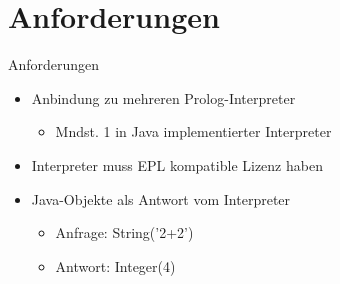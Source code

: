\documentclass[18pt]{beamer}
\begin{document}
\section{Anforderungen}
\begin{frame}{Anforderungen}
\begin{itemize}
\item Anbindung zu mehreren Prolog-Interpreter
\begin{itemize}
\item Mndst. 1 in Java implementierter Interpreter
\end{itemize}
\vspace{0.3cm}
\item Interpreter muss EPL kompatible Lizenz haben
\vspace{0.3cm}
\item Java-Objekte als Antwort vom Interpreter
\begin{itemize}
\item Anfrage: String('2+2')
\item Antwort: Integer(4)
\end{itemize}
\end{itemize}
\end{frame}
\end{document}
